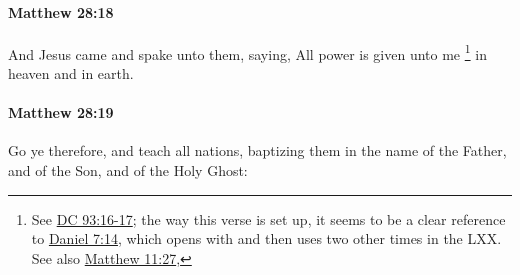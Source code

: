 		\paragraph{Matthew 28:18} %
			\label{MATTHEW-28-18}

			And Jesus came and spake unto them, saying, All power is given unto me%
				\footnote{%
					See \hyperref[DC93-16]{DC 93:16-17}; the way this verse is set up, it seems to be a clear reference to \hyperref[DANIEL-7-14]{Daniel 7:14}, which opens with  and then uses  two other times in the LXX. See also \hyperref[MATTHEW-11-27]{Matthew 11:27}, 
					}
			in heaven and in earth.

			\begin{framed}
			\scriptsize
				\begin{compactdesc}
					\item[SBLG]  \hyperref[EXOUSIA]{} 
				\end{compactdesc}
			\end{framed}

		\paragraph{Matthew 28:19} %
			\label{MATTHEW-28-19}

			Go ye therefore, and teach all nations, baptizing them in the name of the Father, and of the Son, and of the Holy Ghost:

